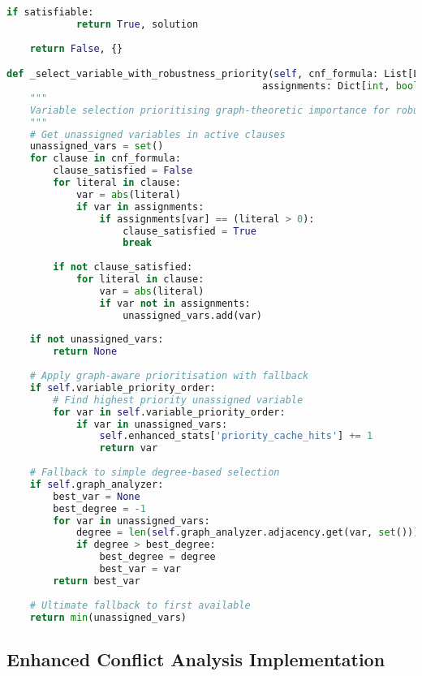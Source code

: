 \begin{lstlisting}[language=Python, caption=Graph-Aware Search Algorithm with Robustness Focus]
        if satisfiable:
            return True, solution
    
    return False, {}

def _select_variable_with_robustness_priority(self, cnf_formula: List[List[int]], 
                                            assignments: Dict[int, bool]) -> Optional[int]:
    """
    Variable selection prioritising graph-theoretic importance for robustness.
    """
    # Get unassigned variables in active clauses
    unassigned_vars = set()
    for clause in cnf_formula:
        clause_satisfied = False
        for literal in clause:
            var = abs(literal)
            if var in assignments:
                if assignments[var] == (literal > 0):
                    clause_satisfied = True
                    break
        
        if not clause_satisfied:
            for literal in clause:
                var = abs(literal)
                if var not in assignments:
                    unassigned_vars.add(var)
    
    if not unassigned_vars:
        return None
    
    # Apply graph-aware prioritisation with fallback
    if self.variable_priority_order:
        # Find highest priority unassigned variable
        for var in self.variable_priority_order:
            if var in unassigned_vars:
                self.enhanced_stats['priority_cache_hits'] += 1
                return var
    
    # Fallback to simple degree-based selection
    if self.graph_analyzer:
        best_var = None
        best_degree = -1
        for var in unassigned_vars:
            degree = len(self.graph_analyzer.adjacency.get(var, set()))
            if degree > best_degree:
                best_degree = degree
                best_var = var
        return best_var
    
    # Ultimate fallback to first available
    return min(unassigned_vars)
\end{lstlisting}

\subsection{Enhanced Conflict Analysis Implementation}
\label{appendix:conflict-analysis}

